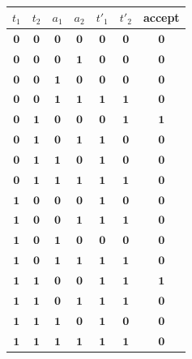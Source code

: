 \begin{table}[h]
\caption{}\label{tbl-4.1}
\begin{center}\begin{tabular}{cccc|ccc}
$t_1$ & $t_2$ & $a_1$ & $a_2$ & $t'_1$ & $t'_2$ & \textbf{accept} \\
\hline
$\pmb{0}$ & $\pmb{0}$ & $\pmb{0}$ & $\pmb{0}$ & $\pmb{0}$ & $\pmb{0}$ &
	$\pmb{0}$ \\
$\pmb{0}$ & $\pmb{0}$ & $\pmb{0}$ & $\pmb{1}$ & $\pmb{0}$ & $\pmb{0}$ &
	$\pmb{0}$ \\
$\pmb{0}$ & $\pmb{0}$ & $\pmb{1}$ & $\pmb{0}$ & $\pmb{0}$ & $\pmb{0}$ &
	$\pmb{0}$ \\
$\pmb{0}$ & $\pmb{0}$ & $\pmb{1}$ & $\pmb{1}$ & $\pmb{1}$ & $\pmb{1}$ &
	$\pmb{0}$ \\
$\pmb{0}$ & $\pmb{1}$ & $\pmb{0}$ & $\pmb{0}$ & $\pmb{0}$ & $\pmb{1}$ &
	$\pmb{1}$ \\
$\pmb{0}$ & $\pmb{1}$ & $\pmb{0}$ & $\pmb{1}$ & $\pmb{1}$ & $\pmb{0}$ &
	$\pmb{0}$ \\
$\pmb{0}$ & $\pmb{1}$ & $\pmb{1}$ & $\pmb{0}$ & $\pmb{1}$ & $\pmb{0}$ &
	$\pmb{0}$ \\
$\pmb{0}$ & $\pmb{1}$ & $\pmb{1}$ & $\pmb{1}$ & $\pmb{1}$ & $\pmb{1}$ &
	$\pmb{0}$ \\
$\pmb{1}$ & $\pmb{0}$ & $\pmb{0}$ & $\pmb{0}$ & $\pmb{1}$ & $\pmb{0}$ &
	$\pmb{0}$ \\
$\pmb{1}$ & $\pmb{0}$ & $\pmb{0}$ & $\pmb{1}$ & $\pmb{1}$ & $\pmb{1}$ &
	$\pmb{0}$ \\
$\pmb{1}$ & $\pmb{0}$ & $\pmb{1}$ & $\pmb{0}$ & $\pmb{0}$ & $\pmb{0}$ &
	$\pmb{0}$ \\
$\pmb{1}$ & $\pmb{0}$ & $\pmb{1}$ & $\pmb{1}$ & $\pmb{1}$ & $\pmb{1}$ &
	$\pmb{0}$ \\
$\pmb{1}$ & $\pmb{1}$ & $\pmb{0}$ & $\pmb{0}$ & $\pmb{1}$ & $\pmb{1}$ &
	$\pmb{1}$ \\
$\pmb{1}$ & $\pmb{1}$ & $\pmb{0}$ & $\pmb{1}$ & $\pmb{1}$ & $\pmb{1}$ &
	$\pmb{0}$ \\
$\pmb{1}$ & $\pmb{1}$ & $\pmb{1}$ & $\pmb{0}$ & $\pmb{1}$ & $\pmb{0}$ &
	$\pmb{0}$ \\
$\pmb{1}$ & $\pmb{1}$ & $\pmb{1}$ & $\pmb{1}$ & $\pmb{1}$ & $\pmb{1}$ &
	$\pmb{0}$
\end{tabular}\end{center}
\end{table}

